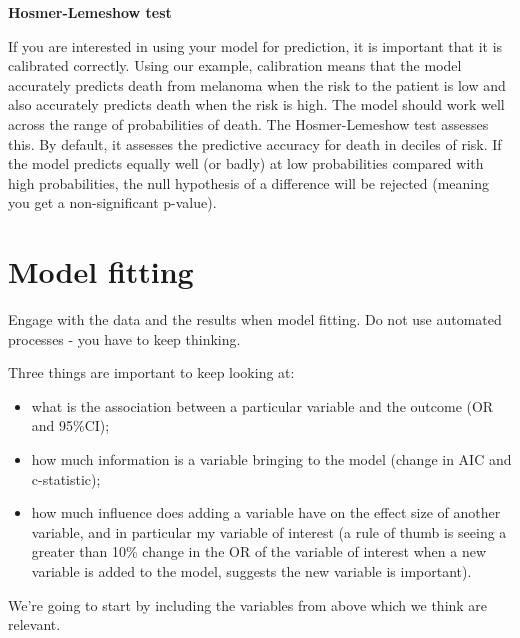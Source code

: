 \documentclass[
  12pt,
  krantz2]{krantz}
\makeatletter
\newenvironment{Shaded}{\begin{snugshade}}{\end{snugshade}}
\newcommand{\DataTypeTok}[1]{\textcolor[rgb]{0.13,0.29,0.53}{#1}}
\newcommand{\KeywordTok}[1]{\textcolor[rgb]{0.13,0.29,0.53}{\textbf{#1}}}
\newcommand{\NormalTok}[1]{#1}
\newcommand{\OperatorTok}[1]{\textcolor[rgb]{0.81,0.36,0.00}{\textbf{#1}}}
\newcommand{\OtherTok}[1]{\textcolor[rgb]{0.56,0.35,0.01}{#1}}
\newcommand{\StringTok}[1]{\textcolor[rgb]{0.31,0.60,0.02}{#1}}
\providecommand{\tightlist}{%
  \setlength{\itemsep}{0pt}\setlength{\parskip}{0pt}}
\newenvironment{kframe}{%
\medskip{}
\setlength{\fboxsep}{.8em}
 \def\at@end@of@kframe{}%
 \ifinner\ifhmode%
  \def\at@end@of@kframe{\end{minipage}}%
  \begin{minipage}{\columnwidth}%
 \fi\fi%
 \def\FrameCommand##1{\hskip\@totalleftmargin \hskip-\fboxsep
 \colorbox{shadecolor}{##1}\hskip-\fboxsep
     \hskip-\linewidth \hskip-\@totalleftmargin \hskip\columnwidth}%
 \MakeFramed {\advance\hsize-\width
   \@totalleftmargin\z@ \linewidth\hsize
   \@setminipage}}%
 {\par\unskip\endMakeFramed%
 \at@end@of@kframe}
\renewenvironment{Shaded}{\begin{kframe}}{\end{kframe}}
\makeatother
\begin{document}
\textbf{Hosmer-Lemeshow test}

If you are interested in using your model for prediction, it is important that it is calibrated correctly.
Using our example, calibration means that the model accurately predicts death from melanoma when the risk to the patient is low and also accurately predicts death when the risk is high.
The model should work well across the range of probabilities of death.
The Hosmer-Lemeshow test assesses this.
By default, it assesses the predictive accuracy for death in deciles of risk.
If the model predicts equally well (or badly) at low probabilities compared with high probabilities, the null hypothesis of a difference will be rejected (meaning you get a non-significant p-value).

\hypertarget{chap09-model-fitting}{%
\section{Model fitting}\label{chap09-model-fitting}}


Engage with the data and the results when model fitting.
Do not use automated processes - you have to keep thinking.

Three things are important to keep looking at:

\begin{itemize}
\tightlist
\item
  what is the association between a particular variable and the outcome (OR and 95\%CI);
\item
  how much information is a variable bringing to the model (change in AIC and c-statistic);
\item
  how much influence does adding a variable have on the effect size of another variable, and in particular my variable of interest (a rule of thumb is seeing a greater than 10\% change in the OR of the variable of interest when a new variable is added to the model, suggests the new variable is important).
\end{itemize}

We're going to start by including the variables from above which we think are relevant.

\begin{Shaded}
\end{Shaded}
\end{document}
